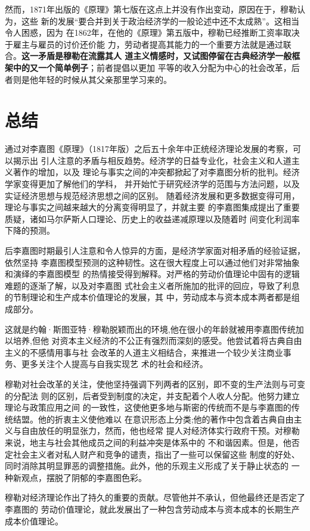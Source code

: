 然而，1871年出版的《原理》第七版在这点上并没有作出变动，原因在于，穆勒认为，这些
新的发展“要合并到关于政治经济学的一般论述中还不太成熟”。这相当令人困惑，因为
在1862年，在他的《原理》第五版中，穆勒已经推断工资率取决于雇主与雇员的讨价还价能
力，劳动者提高其能力的一个重要方法就是通过联合。\textbf{这一矛盾是穆勒在流露其人
  道主义情感时，又试图停留在古典经济学一般框架中的又一个简单例子}；前者提倡以更加
平等的收入分配为中心的社会改革，后者则是他年轻的时候从其父亲那里学习来的。

\section{总结}

通过对李嘉图《原理》（1817年版）之后五十余年中正统经济理论发展的考察，可以揭示出
引人注意的矛盾与相反趋势。经济学的日益专业化，社会主义和人道主义著作的增加，以及
理论与事实之间的冲突都掀起了对李嘉图分析的批判。经济学家变得更加了解他们的学科，
并开始忙于研究经济学的范围与方法问题，以及实证经济思想与规范经济思想之间的区别。
随着经济发展和更多数据变得可用，理论与事实之间越来越大的分离变得明显了，并就主要
的李嘉图集成提出了重要质疑，诸如马尔萨斯人口理论、历史上的收益递减原理以及随着时
间变化利润率下降的预测。

后李嘉图时期最引人注意和令人惊异的方面，是经济学家面对相矛盾的经验证据，依然坚持
李嘉图模型预测的这种韧性。这在很大程度上可以通过他们对非常抽象和演绎的李嘉图模型
的热情接受得到解释。对严格的劳动价值理论中固有的逻辑难题的逐渐了解，以及对李嘉图
式社会主义者所施加的批评的回应，导致了利息的节制理论和生产成本价值理论的发展，其
中，劳动成本与资本成本两者都是组成部分。

这就是约翰·斯图亚特·穆勒脱颖而出的环境,他在很小的年龄就被用李嘉图传统加以培养,但他
对资本主义经济的不公正有强烈而深刻的感受。他尝试着将古典自由主义的不感情用事与社
会改革的人道主义相结合，来推进一个较少关注商业事务、更多关注个人提高与自我实现艺
术的社会和经济。

穆勒对社会改革的关注，使他坚持强调下列两者的区别，即不变的生产法则与可变的分配法
则的区别，后者受到制度的决定，并支配着个人收人分配。他努力建立理论与政策应用之间
的一致性，这使他更多地与斯密的传统而不是与李嘉图的传统结盟。他的折衷主义使他难以
在意识形态上分类;他的著作中包含着古典自由主义与自由放任的明显张力，然而，他也经常
提人对经济体实行政府干预。对穆勒来说，地主与社会其他成员之间的利益冲突是体系中的
不和谐因素。但是，他否定社会主义者对私人财产和竞争的谴责，指出了一些可以保留这些
制度的好处、同时消除其明显罪恶的调整措施。此外，他的乐观主义形成了关于静止状态的
一种新观点，摆脱了阴郁的李嘉图色彩。

穆勒对经济理论作出了持久的重要的贡献。尽管他并不承认，但他最终还是否定了李嘉图的
劳动价值理论，就此发展出了一种包含劳动成本与资本成本的长期生产成本价值理论。



